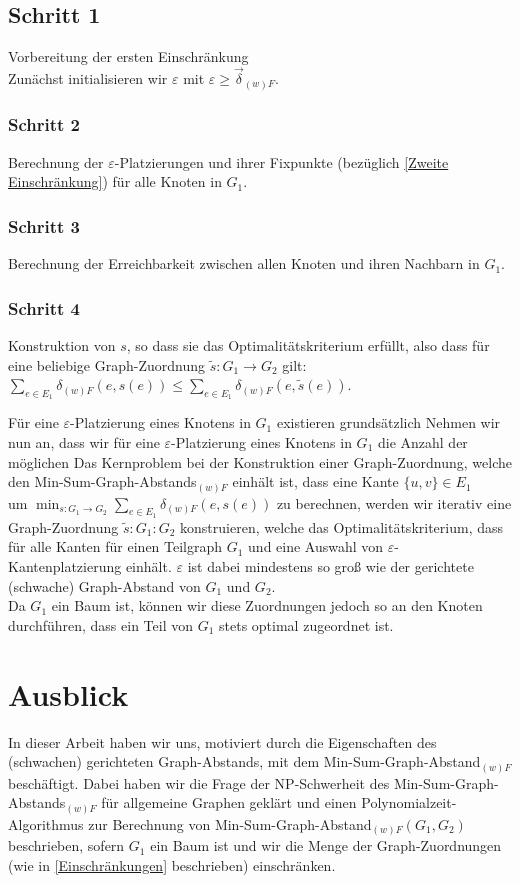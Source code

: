 \documentclass[a4paper, 12pt, twoside]{article}
\theoremstyle{Format1} %
\begin{document}
\subsection{Schritt 1}
Vorbereitung der ersten Einschränkung
\\
Zunächst initialisieren wir $\varepsilon$ mit $\varepsilon \geq \vec{\delta}_{(w)F}$.
\subsubsection{Schritt 2}
Berechnung der $\varepsilon$-Platzierungen und ihrer Fixpunkte (bezüglich \ref{Zweite Einschränkung}) für alle Knoten in $G_1$.

\subsubsection{Schritt 3}
Berechnung der Erreichbarkeit zwischen allen Knoten und ihren Nachbarn in $G_1$.

\subsubsection{Schritt 4}
Konstruktion von $s$, so dass sie das Optimalitätskriterium erfüllt, also dass für eine beliebige Graph-Zuordnung $\tilde{s}: G_1 \to G_2$ gilt:
$\sum_{e \in E_1}\delta_{(w)F}(e, s(e)) \leq \sum_{e \in E_1}\delta_{(w)F}(e, \tilde{s}(e))$.

Für eine $\varepsilon$-Platzierung eines Knotens in $G_1$ existieren grundsätzlich
Nehmen wir nun an, dass wir für eine $\varepsilon$-Platzierung eines Knotens in $G_1$ die Anzahl der möglichen
Das Kernproblem bei der Konstruktion einer Graph-Zuordnung, welche den Min-Sum-Graph-Abstands$_{(w)F}$ einhält ist, dass eine Kante $\{u,v\} \in E_1$
\\
um $ \min_{s: G_1 \to G_2} \sum_{e \in E_1} \delta_{(w)F}(e, s(e))$ zu berechnen, werden wir iterativ eine Graph-Zuordnung $\tilde{s}: G_1: G_2$ konstruieren,
welche das Optimalitätskriterium, dass für alle Kanten für einen Teilgraph $G_1$ und eine Auswahl von $\varepsilon$-Kantenplatzierung einhält.
$\varepsilon$ ist dabei mindestens so groß wie der gerichtete (schwache) Graph-Abstand von $G_1$ und $G_2$.
\\
Da $G_1$ ein Baum ist, können wir diese Zuordnungen jedoch so an den Knoten durchführen, dass ein Teil von $G_1$ stets optimal zugeordnet ist.

\section{Ausblick}
In dieser Arbeit haben wir uns, motiviert durch die Eigenschaften des (schwachen) gerichteten Graph-Abstands, mit dem
Min-Sum-Graph-Abstand$_{(w)F}$ beschäftigt. Dabei haben wir die Frage der NP-Schwerheit des Min-Sum-Graph-Abstands$_{(w)F}$ für allgemeine
Graphen geklärt und einen Polynomialzeit-Algorithmus zur Berechnung von Min-Sum-Graph-Abstand$_{(w)F}(G_1, G_2)$ beschrieben, sofern $G_1$ ein Baum ist
und wir die Menge der Graph-Zuordnungen (wie in \ref{Einschränkungen} beschrieben) einschränken.
\end{document}
